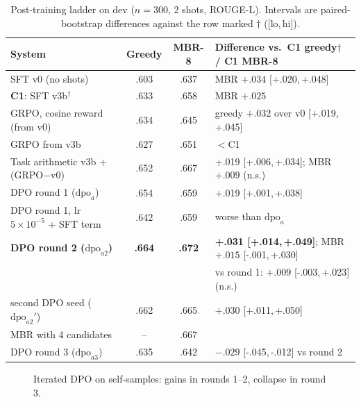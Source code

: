 \documentclass[11pt,a4paper]{article}
\newcommand{\rl}{ROUGE-L}
\newcommand{\ci}[2]{{\scriptsize[#1,\,#2]}}
\newcommand{\best}[1]{\textbf{#1}}
\begin{document}
\begin{table}[H]
\centering
\caption{Post-training ladder on dev ($n{=}300$, 2 shots, \rl{}). Intervals are paired-bootstrap differences against the row marked $\dagger$ (\ci{lo}{hi}).}\label{tab:ladder}
\begin{tabular}{@{}lccl@{}}
\toprule
System & Greedy & MBR-8 & Difference vs.\ C1 greedy$\dagger$ / C1 MBR-8\\
\midrule
SFT v0 (no shots) & .603 & .637 & MBR $+.034$ \ci{+.020}{+.048}\\
\textbf{C1}: SFT v3b$^\dagger$ & .633 & .658 & MBR $+.025$\\
GRPO, cosine reward (from v0) & .634 & .645 & greedy $+.032$ over v0 \ci{+.019}{+.045}\\
GRPO from v3b & .627 & .651 & $<$C1\\
Task arithmetic v3b + (GRPO$-$v0) & .652 & .667 & +.019 \ci{+.006}{+.034}; MBR $+.009$ (n.s.)\\
DPO round 1 ($\mathrm{dpo}_a$) & .654 & .659 & +.019 \ci{+.001}{+.038}\\
DPO round 1, lr $5\!\times\!10^{-5}$ + SFT term & .642 & .659 & worse than $\mathrm{dpo}_a$\\
\best{DPO round 2 ($\mathrm{dpo}_{a2}$)} & \best{.664} & \best{.672} & \best{+.031 \ci{+.014}{+.049}}; MBR $+.015$ \ci{-.001}{+.030}\\
 & & & vs round 1: $+.009$ \ci{-.003}{+.023} (n.s.)\\
\quad second DPO seed ($\mathrm{dpo}_{a2}'$) & .662 & .665 & +.030 \ci{+.011}{+.050}\\
\quad MBR with 4 candidates & -- & .667 & \\
DPO round 3 ($\mathrm{dpo}_{a3}$) & .635 & .642 & $-.029$ \ci{-.045}{-.012} vs round 2\\
\bottomrule
\end{tabular}
\end{table}
\begin{figure}[H]
\centering
{}
\caption{Iterated DPO on self-samples: gains in rounds 1--2, collapse in round 3.}\label{fig:dpo}
\end{figure}
\end{document}
